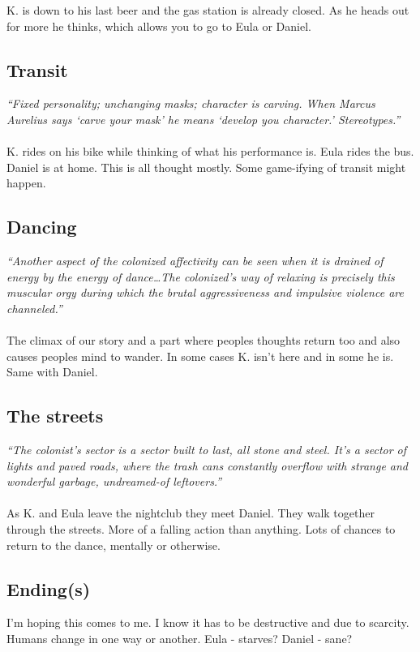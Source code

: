 \documentclass{article}
\begin{document}
K. is down to his last beer and the gas station is already closed. As he heads out for more he thinks, which allows you to go to Eula or Daniel. 
\begin{center}
\resizebox{\textwidth}{!}{
    
}   
\end{center}

\subsection*{Transit}
\textit{``Fixed personality; unchanging masks; character is carving. When Marcus Aurelius says `carve your mask' he means `develop you character.' Stereotypes.''}
\paragraph{}
K. rides on his bike while thinking of what his performance is.
Eula rides the bus.
Daniel is at home.
This is all thought mostly. Some game-ifying of transit might happen.

\subsection*{Dancing}

\textit{``Another aspect of the colonized affectivity can be seen when it is drained of energy by the energy of dance\dots The colonized's way of relaxing is precisely this muscular orgy during which the brutal aggressiveness and impulsive violence are channeled.''} 
\paragraph{}

The climax of our story and a part where peoples thoughts return too and also causes peoples mind to wander. In some cases K. isn't here and in some he is. Same with Daniel.

\subsection*{The streets}
\textit{``The colonist's sector is a sector built to last, all stone and steel. It's a sector of lights and paved roads, where the trash cans constantly overflow with strange and wonderful garbage, undreamed-of leftovers.''}
\paragraph{}
As K. and Eula leave the nightclub they meet Daniel. They walk together through the streets. More of a falling action than anything. Lots of chances to return to the dance, mentally or otherwise.

\subsection*{Ending(s)}

I'm hoping this comes to me. I know it has to be destructive and due to scarcity. Humans change in one way or another. Eula - starves? Daniel - sane?  
\end{document}
